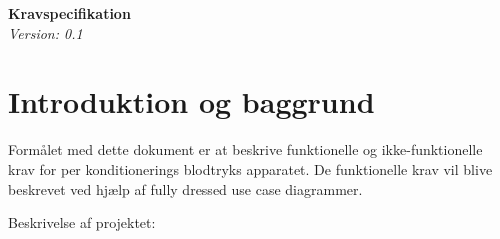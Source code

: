 
\raggedbottom


		\begin{center}
			\Large\textbf{Kravspecifikation}\\
			\large\textit{Version: 0.1} \linebreak \vspace{3cm}
		

		\end{center}
		
	\newpage
	\tableofcontents
	\newpage
	
	\section{Introduktion og baggrund}
	Formålet med dette dokument er at beskrive funktionelle og ikke-funktionelle krav for per konditionerings blodtryks apparatet. De funktionelle krav vil blive beskrevet ved hjælp af fully dressed use case diagrammer. 
	
	Beskrivelse af projektet: 
	
